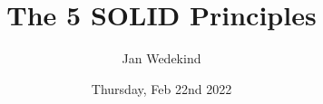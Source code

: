 \documentclass[calcdimensions,landscape,letterpaper]{powersem}
\title{The 5 SOLID Principles}
\author{Jan Wedekind}
\date{Thursday, Feb 22nd 2022}
\newcommand{\thecurrentheading}{}
\newcommand{\heading}[1]{\renewcommand{\thecurrentheading}{#1}}
\begin{document}
\begin{slide}
  \heading{\thetitle}
  \begin{center}
    \maketitle
  \end{center}
\end{slide}
\end{document}
